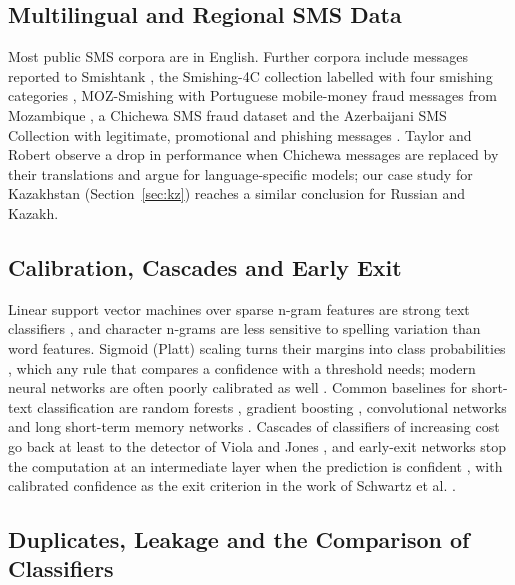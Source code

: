 \subsection{Multilingual and Regional SMS Data}\label{sec:rel-data}

Most public SMS corpora are in English. Further corpora include messages reported to Smishtank \cite{timko2024}, the Smishing-4C collection labelled with four smishing categories \cite{smishing4c2024}, MOZ-Smishing with Portuguese mobile-money fraud messages from Mozambique \cite{moz2025}, a Chichewa SMS fraud dataset \cite{taylor2025} and the Azerbaijani SMS Collection with legitimate, promotional and phishing messages \cite{shahbazov2026}. Taylor and Robert \cite{taylor2025} observe a drop in performance when Chichewa messages are replaced by their translations and argue for language-specific models; our case study for Kazakhstan (Section~\ref{sec:kz}) reaches a similar conclusion for Russian and Kazakh.

\subsection{Calibration, Cascades and Early Exit}\label{sec:rel-cascade}

Linear support vector machines over sparse n-gram features are strong text classifiers \cite{cortes1995,joachims1998}, and character n-grams are less sensitive to spelling variation than word features. Sigmoid (Platt) scaling turns their margins into class probabilities \cite{niculescu2005}, which any rule that compares a confidence with a threshold needs; modern neural networks are often poorly calibrated as well \cite{guo2017}. Common baselines for short-text classification are random forests \cite{breiman2001}, gradient boosting \cite{chen2016}, convolutional networks \cite{kim2014} and long short-term memory networks \cite{hochreiter1997}. Cascades of classifiers of increasing cost go back at least to the detector of Viola and Jones \cite{viola2001}, and early-exit networks stop the computation at an intermediate layer when the prediction is confident \cite{teerapittayanon2016,schwartz2020}, with calibrated confidence as the exit criterion in the work of Schwartz et al. \cite{schwartz2020}.

\subsection{Duplicates, Leakage and the Comparison of Classifiers}\label{sec:rel-leak}


